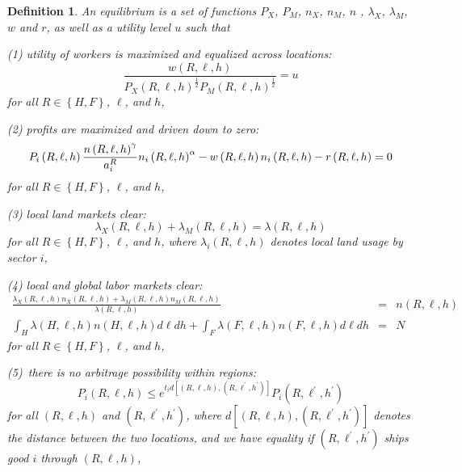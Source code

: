 \documentclass[12pt]{article}
\newtheorem{definition}{Definition}
\begin{document}
\begin{definition}
An equilibrium is a set of functions $P_{X}$, $P_{M}$, $n_{X}$, $n_{M}$, $n$%
, $\lambda _{X}$, $\lambda _{M}$, $w$ and $r$, as well as a utility level $u$ such that

(1) utility of workers is maximized and equalized across locations:%
\begin{equation*}
\frac{w\left( R,\ell ,h\right) }{P_{X}\left( R,\ell ,h\right) ^{\frac{1}{2}%
}P_{M}\left( R,\ell ,h\right) ^{\frac{1}{2}}}=u
\end{equation*}%
for all $R\in \left \{ H,F\right \} $, $\ell $, and $h$,

(2) profits are maximized and driven down to zero:%
\begin{equation*}
P_{i}\left( R,\ell ,h\right) \frac{%
n \left( R,\ell ,h\right) ^{\gamma }}{a_{i}^{R}} n_{i}\left( R,\ell ,h\right) ^{\alpha } 
- w\left( R,\ell ,h\right)
n_{i}\left( R,\ell ,h\right) -r\left( R,\ell ,h\right) = 0
\end{equation*}
for all $R\in \left \{ H,F\right \} $, $\ell $, and $h$,

(3) local land markets clear:%
\begin{equation*}
\lambda _{X}\left( R,\ell ,h\right) +\lambda _{M}\left( R,\ell ,h\right)
=\lambda \left( R,\ell ,h\right)
\end{equation*}%
for all $R\in \left \{ H,F\right \} $, $\ell $, and $h$, where $\lambda
_{i}\left( R,\ell ,h\right) $ denotes local land usage by sector $i$,

(4) local and global labor markets clear:%
\begin{eqnarray*}
\frac{\lambda _{X}\left( R,\ell ,h\right) n_{X}\left( R,\ell ,h\right)
+\lambda _{M}\left( R,\ell ,h\right) n_{M}\left( R,\ell ,h\right) }{\lambda
\left( R,\ell ,h\right) } &=&n\left( R,\ell ,h\right) \\
\int_{H}\lambda \left( H,\ell ,h\right) n\left( H,\ell ,h\right) d \ell dh + 
\int_{F}\lambda \left( F,\ell ,h\right) n\left( F,\ell ,h\right) d \ell dh &=&N
\end{eqnarray*}%
for all $R\in \left \{ H,F\right \} $, $\ell $, and $h$,

(5)\ there is no arbitrage possibility within regions:%
\begin{equation*}
P_{i}\left( R,\ell ,h\right) \leq e^{t_{i}d\left[ \left( R,\ell ,h\right)
,\left( R,\ell ^{\prime },h^{\prime }\right) \right] }P_{i}\left( R,\ell
^{\prime },h^{\prime }\right)
\end{equation*}%
for all $\left( R,\ell ,h\right) $ and $\left( R,\ell ^{\prime },h^{\prime
}\right) $, where $d\left[ \left( R,\ell ,h\right) ,\left( R,\ell ^{\prime
},h^{\prime }\right) \right] $ denotes the distance between the two
locations, and we have equality if $\left( R,\ell ^{\prime },h^{\prime
}\right) $ ships good $i$ through $\left( R,\ell ,h\right) $,


\end{definition}
\end{document}
